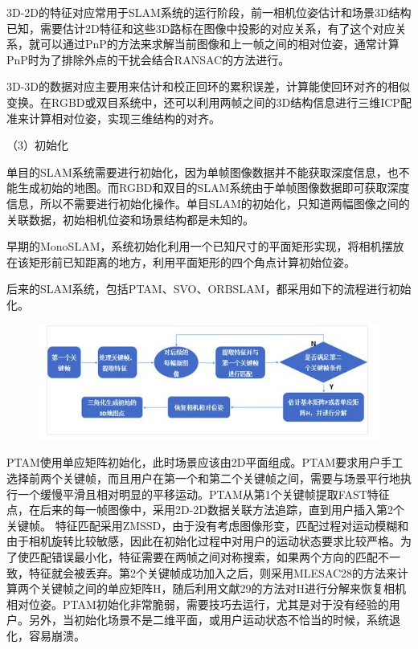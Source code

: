 3D-2D的特征对应常用于SLAM系统的运行阶段，前一相机位姿估计和场景3D结构已知，需要估计2D特征和这些3D路标在图像中投影的对应关系，有了这个对应关系，就可以通过PnP的方法来求解当前图像和上一帧之间的相对位姿，通常计算PnP时为了排除外点的干扰会结合RANSAC的方法进行。

3D-3D的数据对应主要用来估计和校正回环的累积误差，计算能使回环对齐的相似变换。在RGBD或双目系统中，还可以利用两帧之间的3D结构信息进行三维ICP配准来计算相对位姿，实现三维结构的对齐。

（3）初始化

单目的SLAM系统需要进行初始化，因为单帧图像数据并不能获取深度信息，也不能生成初始的地图。而RGBD和双目的SLAM系统由于单帧图像数据即可获取深度信息，所以不需要进行初始化操作。单目SLAM的初始化，只知道两幅图像之间的关联数据，初始相机位姿和场景结构都是未知的。

早期的MonoSLAM，系统初始化利用一个已知尺寸的平面矩形实现，将相机摆放在该矩形前已知距离的地方，利用平面矩形的四个角点计算初始位姿。

后来的SLAM系统，包括PTAM、SVO、ORBSLAM，都采用如下的流程进行初始化。
\begin{figure}[H]%
	\centering  %
	\includegraphics[width=0.7\linewidth]{image/Talk/18.png}  %

\end{figure}


PTAM使用单应矩阵初始化，此时场景应该由2D平面组成。PTAM要求用户手工选择前两个关键帧，而且用户在第一个和第二个关键帧之间，需要与场景平行地执行一个缓慢平滑且相对明显的平移运动。PTAM从第1个关键帧提取FAST特征点，在后来的每一帧图像中，采用2D-2D数据关联方法追踪，直到用户插入第2个关键帧。 特征匹配采用ZMSSD，由于没有考虑图像形变，匹配过程对运动模糊和由于相机旋转比较敏感，因此在初始化过程中对用户的运动状态要求比较严格。为了使匹配错误最小化，特征需要在两帧之间对称搜索，如果两个方向的匹配不一致，特征就会被丢弃。第2个关键帧成功加入之后，则采用MLESAC28的方法来计算两个关键帧之间的单应矩阵H，随后利用文献29的方法对H进行分解来恢复相机相对位姿。PTAM初始化非常脆弱，需要技巧去运行，尤其是对于没有经验的用户。另外，当初始化场景不是二维平面，或用户运动状态不恰当的时候，系统退化，容易崩溃。

